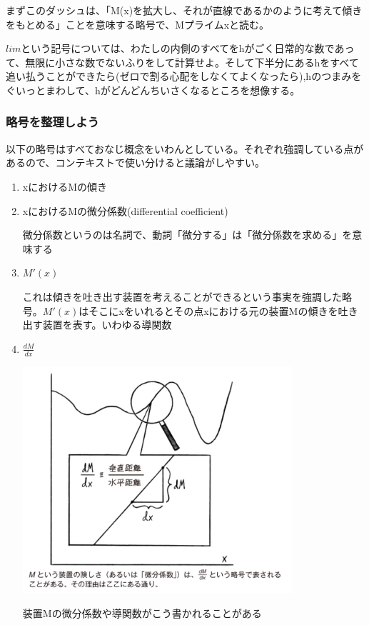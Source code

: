 \documentclass[dvipdfmx]{jsarticle}
\begin{document}
まずこのダッシュは、「M(x)を拡大し、それが直線であるかのように考えて傾きをもとめる」ことを意味する略号で、Mプライムxと読む。

$lim$という記号については、わたしの内側のすべてをhがごく日常的な数であって、無限に小さな数でないふりをして計算せよ。そして下半分にあるhをすべて追い払うことができたら(ゼロで割る心配をしなくてよくなったら),hのつまみをぐいっとまわして、hがどんどんちいさくなるところを想像する。

\subsubsection{略号を整理しよう}

以下の略号はすべておなじ概念をいわんとしている。それぞれ強調している点があるので、コンテキストで使い分けると議論がしやすい。
\begin{enumerate}
 \item xにおけるMの傾き

 \item xにおけるMの微分係数(differential coefficient)

微分係数というのは名詞で、動詞「微分する」は「微分係数を求める」を意味する

 \item $M'(x)$

 これは傾きを吐き出す装置を考えることができるという事実を強調した略号。$M'(x)$はそこにxをいれるとその点xにおける元の装置Mの傾きを吐き出す装置を表す。いわゆる導関数

 \item $\frac{dM}{dx}$

 \includegraphics[width=10cm]{images/burn_math_2-2.png}

 装置Mの微分係数や導関数がこう書かれることがある


\end{enumerate}
\end{document}
